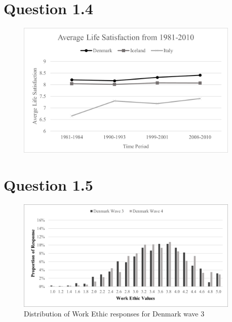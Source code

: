 \documentclass[11pt,a4paper]{article}
\begin{document}
\newpage
\section*{Question 1.4}



\begin{figure}[h]
  \begin{center}
    \includegraphics[width=0.95\textwidth]{figures/Q1_4.png}
  \end{center}
  \caption{}
  \label{fig:Q1_4}
\end{figure}



\newpage
\section*{Question 1.5}



\begin{figure}[H]
  \begin{center}
    \includegraphics[width=0.95\textwidth]{figures/DenmarkQ1_5}
  \end{center}
  \caption{Distribution of Work Ethic responses for Denmark wave 3}
  \label{fig:}
\end{figure}
\end{document}

